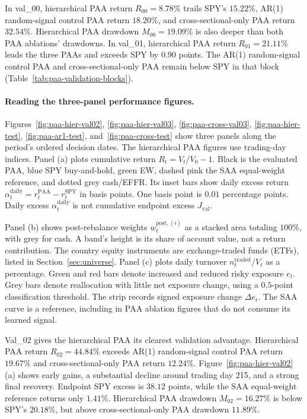 In val\_00, hierarchical PAA return \(R_{00}=8.78\%\) trails SPY's \(15.22\%\), AR(1) random-signal control PAA return \(18.20\%\), and cross-sectional-only PAA return \(32.54\%\). Hierarchical PAA drawdown \(M_{00}=19.09\%\) is also deeper than both PAA ablations' drawdowns. In val\_01, hierarchical PAA return \(R_{01}=21.11\%\) leads the three PAAs and exceeds SPY by \(0.90\) points. The AR(1) random-signal control PAA and cross-sectional-only PAA remain below SPY in that block (Table~\ref{tab:paa-validation-blocks}).

\paragraph{Reading the three-panel performance figures.}
Figures~\ref{fig:paa-hier-val02}, \ref{fig:paa-hier-val03}, \ref{fig:paa-cross-val03}, \ref{fig:paa-hier-test}, \ref{fig:paa-ar1-test}, and~\ref{fig:paa-cross-test} show three panels along the period's ordered decision dates. The hierarchical PAA figures use trading-day indices. Panel (a) plots cumulative return \(R_t=V_t/V_0-1\). Black is the evaluated PAA, blue SPY buy-and-hold, green EW, dashed pink the SAA equal-weight reference, and dotted grey cash/EFFR. Its inset bars show daily excess return \(\alpha_t^{\mathrm{daily}}=r_t^{\mathrm{PAA}}-r_t^{\mathrm{SPY}}\) in basis points. One basis point is \(0.01\) percentage points. Daily excess \(\alpha_t^{\mathrm{daily}}\) is not cumulative endpoint excess \(J_{\mathrm{val}}\).

Panel (b) shows post-rebalance weights \(w_t^{\mathrm{post},(i)}\) as a stacked area totaling \(100\%\), with grey for cash. A band's height is its share of account value, not a return contribution. The country equity instruments are exchange-traded funds (ETFs), listed in Section~\ref{sec:universe}. Panel (c) plots daily turnover \(n_t^{\mathrm{traded}}/V_t\) as a percentage. Green and red bars denote increased and reduced risky exposure \(e_t\). Grey bars denote reallocation with little net exposure change, using a \(0.5\)-point classification threshold. The strip records signed exposure change \(\Delta e_t\). The SAA curve is a reference, including in PAA ablation figures that do not consume its learned signal.

Val\_02 gives the hierarchical PAA its clearest validation advantage. Hierarchical PAA return \(R_{02}=44.84\%\) exceeds AR(1) random-signal control PAA return \(19.67\%\) and cross-sectional-only PAA return \(12.24\%\). Figure~\ref{fig:paa-hier-val02}(a) shows early gains, a substantial decline around trading day 215, and a strong final recovery. Endpoint SPY excess is \(38.12\) points, while the SAA equal-weight reference returns only \(1.41\%\). Hierarchical PAA drawdown \(M_{02}=16.27\%\) is below SPY's \(20.18\%\), but above cross-sectional-only PAA drawdown \(11.89\%\).

